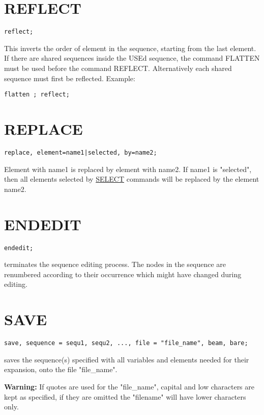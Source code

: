 \section{REFLECT}
\label{sec:reflect}
\begin{verbatim}
reflect;
\end{verbatim} 
This inverts the order of element in the sequence, starting from the
last element. \\ 
If there are shared sequences inside the USEd sequence, the command
FLATTEN must be used before the command REFLECT.  Alternatively each
shared sequence must first be reflected. Example:   
\begin{verbatim}
flatten ; reflect; 
\end{verbatim}


\section{REPLACE}
\label{sec:replace}
\begin{verbatim}
replace, element=name1|selected, by=name2;
\end{verbatim} 
Element with name1 is replaced by element with name2. 
If name1 is "selected", then all elements selected by
\href{../Introduction/select.html}{SELECT} commands will be replaced by
the element name2.  


\section{ENDEDIT}
\label{sec:endedit}
\begin{verbatim}
endedit;
\end{verbatim} 
terminates the sequence editing process. The nodes in the sequence are
renumbered according to their occurrence which might have changed during
editing.  



\section{SAVE}
\label{sec:save}
\begin{verbatim}
save, sequence = sequ1, sequ2, ..., file = "file_name", beam, bare;
\end{verbatim} 
saves the sequence(s) specified with all variables and elements needed
for their expansion, onto the file "file\_name". 

{\bf Warning:} If quotes are used for
the "file\_name", capital and low characters are kept as specified, if they
are omitted the "filename" will have lower characters only. 

